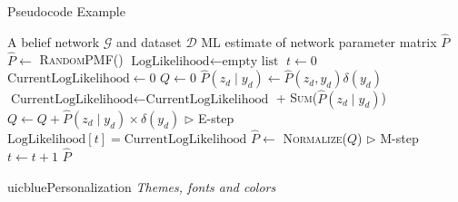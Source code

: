 \documentclass{beamer}
\begin{document}
\renewcommand{\algorithmicrequire}{\textbf{Input:}}
\renewcommand{\algorithmicensure}{\textbf{Output:}}
\newcommand*\CALL[2]{\textsc{#1}(#2)}
\newcommand*\ANNOTATE[1]{\hfill\(\triangleright\) #1}%

\footlinecolor{}

\begin{frame}[fragile]{Pseudocode Example}
\begin{algorithm}[H]
\fontsize{8}{1}\selectfont
\caption{Running EM using the joint PMFs, $P$, $Q$, $\hat P$}
\begin{algorithmic}
\REQUIRE A belief network $\mathcal{G}$ and dataset $ \mathcal{D}$
\ENSURE ML estimate of network parameter matrix $\hat P$
\STATE $\hat P \gets$ \CALL{RandomPMF}{}
\STATE $\text{LogLikelihood} \gets \text{empty list}$
\STATE $t \gets 0$
\REPEAT
    \STATE $\text{CurrentLogLikelihood} \gets 0$
    \STATE $Q \gets 0$
        \STATE $\hat P(z_d \mid y_d) \gets \hat P(z_d, y_d) \delta(y_d)$
        \STATE $\text{CurrentLogLikelihood} \gets \text{CurrentLogLikelihood}$ + \CALL{Sum}{$\hat P(z_d \mid y_d)$}
        \STATE $Q \gets Q + \hat P(z_d \mid y_d) \times \delta(y_d)$ \ANNOTATE{E-step}
    \ENDFOR
    \STATE $\text{LogLikelihood}[t] = \text{CurrentLogLikelihood}$
    \STATE $\hat P \gets$ \CALL{Normalize}{$Q$} \ANNOTATE{M-step}
    \STATE $t \gets t + 1$
\RETURN $\hat P$
\end{algorithmic}
\end{algorithm}
\end{frame}



\begin{chapter}{uicblue}{Personalization}
\textit{Themes, fonts and colors}
\end{chapter}
\end{document}
